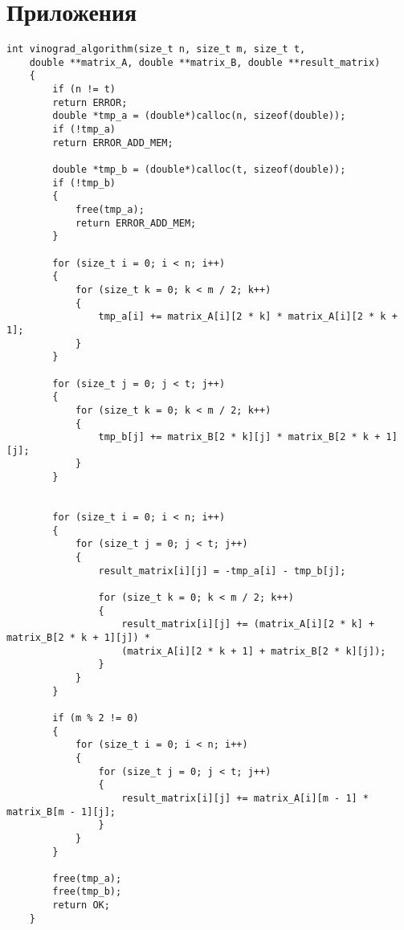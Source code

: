 \chapter*{Приложения}

\renewcommand{\thelstlisting}{A.\arabic{lstlisting}}
\setcounter{lstlisting}{0}


\begin{lstlisting}[label=lst_vino_algo, caption=Реализация алгоритма Винограда]
	int vinograd_algorithm(size_t n, size_t m, size_t t,
	double **matrix_A, double **matrix_B, double **result_matrix)
	{
		if (n != t)
		return ERROR;
		double *tmp_a = (double*)calloc(n, sizeof(double));
		if (!tmp_a)
		return ERROR_ADD_MEM;
		
		double *tmp_b = (double*)calloc(t, sizeof(double));
		if (!tmp_b)
		{
			free(tmp_a);
			return ERROR_ADD_MEM;
		}
		
		for (size_t i = 0; i < n; i++)
		{
			for (size_t k = 0; k < m / 2; k++)
			{
				tmp_a[i] += matrix_A[i][2 * k] * matrix_A[i][2 * k + 1];
			}
		}
		
		for (size_t j = 0; j < t; j++)
		{
			for (size_t k = 0; k < m / 2; k++)
			{
				tmp_b[j] += matrix_B[2 * k][j] * matrix_B[2 * k + 1][j];
			}
		}
		
		
		for (size_t i = 0; i < n; i++)
		{
			for (size_t j = 0; j < t; j++)
			{
				result_matrix[i][j] = -tmp_a[i] - tmp_b[j];
				
				for (size_t k = 0; k < m / 2; k++)
				{
					result_matrix[i][j] += (matrix_A[i][2 * k] + matrix_B[2 * k + 1][j]) *
					(matrix_A[i][2 * k + 1] + matrix_B[2 * k][j]);
				}
			}
		}
		
		if (m % 2 != 0)
		{
			for (size_t i = 0; i < n; i++)
			{
				for (size_t j = 0; j < t; j++)
				{
					result_matrix[i][j] += matrix_A[i][m - 1] * matrix_B[m - 1][j];
				}
			}
		}
		
		free(tmp_a);
		free(tmp_b);
		return OK;
	}
\end{lstlisting}

